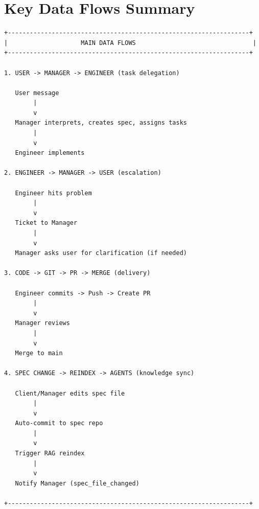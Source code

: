 \documentclass[11pt,a4paper]{article}
\begin{document}
\section{Key Data Flows Summary}

\begin{verbatim}
+------------------------------------------------------------------+
|                    MAIN DATA FLOWS                                |
+------------------------------------------------------------------+

1. USER -> MANAGER -> ENGINEER (task delegation)

   User message
        |
        v
   Manager interprets, creates spec, assigns tasks
        |
        v
   Engineer implements

2. ENGINEER -> MANAGER -> USER (escalation)

   Engineer hits problem
        |
        v
   Ticket to Manager
        |
        v
   Manager asks user for clarification (if needed)

3. CODE -> GIT -> PR -> MERGE (delivery)

   Engineer commits -> Push -> Create PR
        |
        v
   Manager reviews
        |
        v
   Merge to main

4. SPEC CHANGE -> REINDEX -> AGENTS (knowledge sync)

   Client/Manager edits spec file
        |
        v
   Auto-commit to spec repo
        |
        v
   Trigger RAG reindex
        |
        v
   Notify Manager (spec_file_changed)

+------------------------------------------------------------------+
\end{verbatim}
\end{document}
